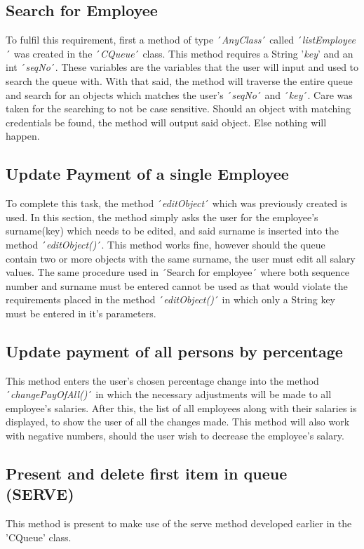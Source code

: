 \documentclass[12pt]{article}
\begin{document}
\subsection{Search for Employee}
To fulfil this requirement, first a method of type ´\emph{AnyClass}´ called ´\emph{listEmployee}´ was created in the ´\emph{CQueue}´ class. This method requires a String '\emph{key}' and an int ´\emph{seqNo}´. These variables are the variables that the user will input and used to search the queue with. With that said, the method will traverse the entire queue and search for an objects which matches the user's ´\emph{seqNo}´ and ´\emph{key}´. Care was taken for the searching to not be case sensitive. Should an object with matching credentials be found, the method will output said object. Else nothing will happen.

\subsection{Update Payment of a single Employee}
To complete this task, the method ´\emph{editObject}´ which was previously created is used. In this section, the method simply asks the user for the employee's surname(key) which needs to be edited, and said surname is inserted into the method ´\emph{editObject()}´. This method works fine, however should the queue contain two or more objects with the same surname, the user must edit all salary values. The same procedure used in ´Search for employee´ where both sequence number and surname must be entered cannot be used as that would violate the requirements placed in the method ´\emph{editObject()}´ in which only a String key must be entered in it's parameters.

\subsection{Update payment of all persons by percentage}
This method enters the user's chosen percentage change into the method ´\emph{changePayOfAll()}´ in which the necessary adjustments will be made to all employee's salaries. After this, the list of all employees along with their salaries is displayed, to show the user of all the changes made. This method will also work with negative numbers, should the user wish to decrease the employee's salary.

\subsection{Present and delete first item in queue (SERVE)}
This method is present to make use of the serve method developed earlier in the 'CQueue' class.
\end{document}
